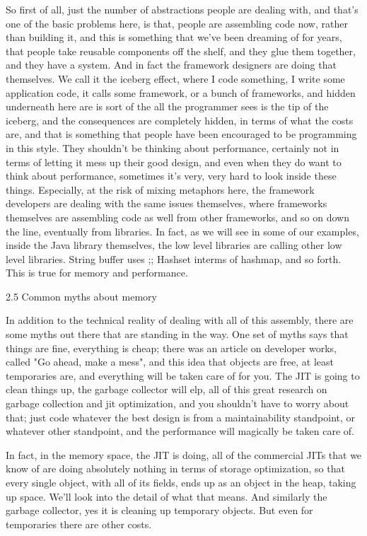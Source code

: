 So first of all, just the number of abstractions people are dealing with, and
that's one of the basic problems here, is that, people are assembling code now,
rather than building it, and this is something that we've been dreaming of for
years, that people take reusable components off the shelf, and they glue them
together, and they have a system. And in fact the framework designers are doing
that themselves.  We call it the iceberg effect, where I code something, I write
some application code, it calls some framework, or a bunch of frameworks, and
hidden underneath here are is sort of the all the programmer sees is the tip of
the iceberg, and the consequences are completely hidden, in terms of what the
costs are, and that is something that people have been encouraged to be
programming in this style. They shouldn't be thinking about performance,
certainly not in terms of letting it mess up their good design, and even when
they do want to think about performance, sometimes it's very, very hard to look
inside these things.  Especially, at the risk of mixing metaphors here, the
framework developers are dealing with the same issues themselves, where
frameworks themselves are assembling code as well from other frameworks, and so
on down the line, eventually from libraries. In fact, as we will see in some of
our examples, inside the Java library themselves, the low level libraries are
calling other low level libraries.  String buffer uses ;;  Hashset interms of
hashmap, and so forth.  This is true for memory and performance.

2.5 Common myths about memory

In addition to the technical reality of dealing with all of this assembly, there
are some myths out there that are standing in the way.  One set of myths says
that things are fine, everything is cheap; there was an article on developer
works, called "Go ahead, make a mess",  and this idea that objects are free, at
least temporaries are, and everything will be taken care of for you. The JIT is
going to clean things up, the garbage collector will elp, all of this great
research on garbage collection and jit optimization, and you shouldn't have to
worry about that; just code whatever the best design is from a maintainability
standpoint, or whatever other standpoint, and the performance will magically be
taken care of.

In fact, in the memory space, the JIT is doing, all of the commercial JITs that
we know of are doing absolutely nothing in terms of storage optimization, so
that every single object, with all of its fields, ends up as an object in the
heap, taking up space.  We'll look into the detail of what that means. And
similarly the garbage collector, yes it is cleaning up temporary objects. But
even for temporaries there are other costs.

